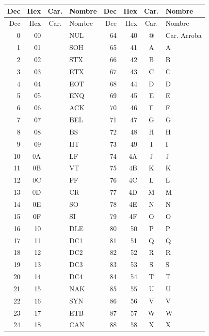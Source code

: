 \documentclass[12pt,twoside]{book}
\begin{document}
			\small
			\begin{longtable}{r r c l r r c l}
				\hline
				Dec & Hex & Car. & Nombre & Dec & Hex & Car. & Nombre \\
				\hline
				\endfirsthead
				
				\hline
				Dec & Hex & Car. & Nombre & Dec & Hex & Car. & Nombre \\
				\hline
				\endhead
				
				\hline
				\endfoot
				
				\hline
				\endlastfoot
				
				0 & 00 &  & NUL & 64 & 40 & @ & Car. Arroba \\
				1 & 01 &  & SOH & 65 & 41 & A & A \\
				2 & 02 &  & STX & 66 & 42 & B & B \\
				3 & 03 &  & ETX & 67 & 43 & C & C \\
				4 & 04 &  & EOT & 68 & 44 & D & D \\
				5 & 05 &  & ENQ & 69 & 45 & E & E \\
				6 & 06 &  & ACK & 70 & 46 & F & F \\
				7 & 07 &  & BEL & 71 & 47 & G & G \\
				8 & 08 &  & BS  & 72 & 48 & H & H \\
				9 & 09 &  & HT  & 73 & 49 & I & I \\
				10 & 0A &  & LF  & 74 & 4A & J & J \\
				11 & 0B &  & VT  & 75 & 4B & K & K \\
				12 & 0C &  & FF  & 76 & 4C & L & L \\
				13 & 0D &  & CR  & 77 & 4D & M & M \\
				14 & 0E &  & SO  & 78 & 4E & N & N \\
				15 & 0F &  & SI  & 79 & 4F & O & O \\
				16 & 10 &  & DLE & 80 & 50 & P & P \\
				17 & 11 &  & DC1 & 81 & 51 & Q & Q \\
				18 & 12 &  & DC2 & 82 & 52 & R & R \\
				19 & 13 &  & DC3 & 83 & 53 & S & S \\
				20 & 14 &  & DC4 & 84 & 54 & T & T \\
				21 & 15 &  & NAK & 85 & 55 & U & U \\
				22 & 16 &  & SYN & 86 & 56 & V & V \\
				23 & 17 &  & ETB & 87 & 57 & W & W \\
				24 & 18 &  & CAN & 88 & 58 & X & X \\

\end{longtable}
\end{document}
